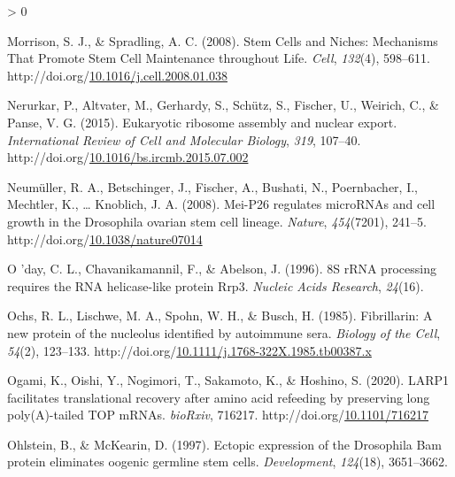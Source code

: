 \documentclass[12pt,oneside]{reedthesis}
\newlength{\cslhangindent}
\newenvironment{CSLReferences}[2] %
 {%
  \setlength{\parindent}{0pt}
  \ifodd #1 \everypar{\setlength{\hangindent}{\cslhangindent}}\ignorespaces\fi
  \ifnum #2 > 0
  \setlength{\parskip}{#2\baselineskip}
  \fi
 }%
 {}
\begin{document}
\begin{CSLReferences}{1}{0}
\leavevmode\hypertarget{ref-morrisonStemCellsNiches2008}{}%
Morrison, S. J., \& Spradling, A. C. (2008). Stem {Cells} and {Niches}: {Mechanisms That Promote Stem Cell Maintenance} throughout {Life}. \emph{Cell}, \emph{132}(4), 598--611. http://doi.org/\href{https://doi.org/10.1016/j.cell.2008.01.038}{10.1016/j.cell.2008.01.038}

\leavevmode\hypertarget{ref-nerurkarEukaryoticRibosomeAssembly2015}{}%
Nerurkar, P., Altvater, M., Gerhardy, S., Schütz, S., Fischer, U., Weirich, C., \& Panse, V. G. (2015). Eukaryotic ribosome assembly and nuclear export. \emph{International Review of Cell and Molecular Biology}, \emph{319}, 107--40. http://doi.org/\href{https://doi.org/10.1016/bs.ircmb.2015.07.002}{10.1016/bs.ircmb.2015.07.002}

\leavevmode\hypertarget{ref-Neumuller2008}{}%
Neumüller, R. A., Betschinger, J., Fischer, A., Bushati, N., Poernbacher, I., Mechtler, K., \ldots{} Knoblich, J. A. (2008). Mei-{P26} regulates {microRNAs} and cell growth in the {Drosophila} ovarian stem cell lineage. \emph{Nature}, \emph{454}(7201), 241--5. http://doi.org/\href{https://doi.org/10.1038/nature07014}{10.1038/nature07014}

\leavevmode\hypertarget{ref-oday8SRRNAProcessing1996}{}%
O 'day, C. L., Chavanikamannil, F., \& Abelson, J. (1996). {8S rRNA} processing requires the {RNA} helicase-like protein {Rrp3}. \emph{Nucleic Acids Research}, \emph{24}(16).

\leavevmode\hypertarget{ref-ochsFibrillarinNewProtein1985}{}%
Ochs, R. L., Lischwe, M. A., Spohn, W. H., \& Busch, H. (1985). Fibrillarin: A new protein of the nucleolus identified by autoimmune sera. \emph{Biology of the Cell}, \emph{54}(2), 123--133. http://doi.org/\href{https://doi.org/10.1111/j.1768-322X.1985.tb00387.x}{10.1111/j.1768-322X.1985.tb00387.x}

\leavevmode\hypertarget{ref-ogamiLARP1FacilitatesTranslational2020}{}%
Ogami, K., Oishi, Y., Nogimori, T., Sakamoto, K., \& Hoshino, S. (2020). {LARP1} facilitates translational recovery after amino acid refeeding by preserving long poly({A})-tailed {TOP mRNAs}. \emph{bioRxiv}, 716217. http://doi.org/\href{https://doi.org/10.1101/716217}{10.1101/716217}

\leavevmode\hypertarget{ref-ohlsteinEctopicExpressionDrosophila1997}{}%
Ohlstein, B., \& McKearin, D. (1997). Ectopic expression of the {Drosophila Bam} protein eliminates oogenic germline stem cells. \emph{Development}, \emph{124}(18), 3651--3662.


\end{CSLReferences}
\end{document}
